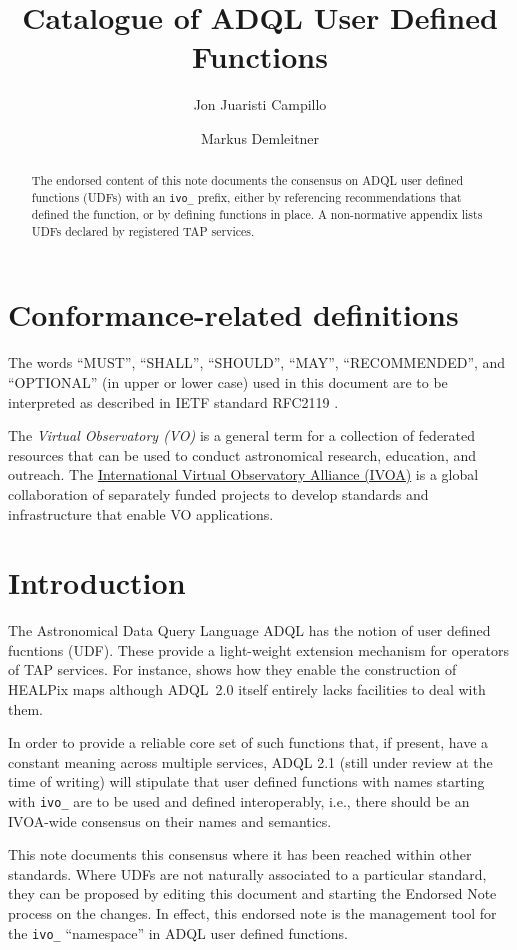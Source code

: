 \documentclass[11pt,a4paper]{ivoa}
\title{Catalogue of ADQL User Defined Functions}
\author{Jon Juaristi Campillo}
\author[https://wiki.ivoa.net/twiki/bin/view/IVOA/MarkusDemleitner]{Markus Demleitner}
\begin{document}
\begin{abstract}
The endorsed content of this note documents the consensus on ADQL user
defined functions (UDFs) with an \verb|ivo_| prefix, either by
referencing recommendations that defined the function, or by defining
functions in place.  A non-normative appendix lists UDFs declared by
registered TAP services.
\end{abstract}


\section*{Conformance-related definitions}

The words ``MUST'', ``SHALL'', ``SHOULD'', ``MAY'', ``RECOMMENDED'', and
``OPTIONAL'' (in upper or lower case) used in this document are to be
interpreted as described in IETF standard RFC2119 \citep{std:RFC2119}.

The \emph{Virtual Observatory (VO)} is a
general term for a collection of federated resources that can be used
to conduct astronomical research, education, and outreach.
The \href{http://www.ivoa.net}{International
Virtual Observatory Alliance (IVOA)} is a global
collaboration of separately funded projects to develop standards and
infrastructure that enable VO applications.


\section{Introduction}

The Astronomical Data Query Language ADQL \citep{2008ivoa.spec.1030O}
has the notion of user defined fucntions (UDF).  These provide a
light-weight extension mechanism for operators of TAP services.  
For instance, \citet{2016arXiv161109190T} shows how they enable the
construction of HEALPix maps although ADQL~2.0 itself entirely lacks
facilities to deal with them.

In order to provide a reliable core set of such functions that, if
present, have a constant meaning across multiple services, ADQL 2.1
(still under review at the time of writing) will stipulate that user
defined functions with names starting with \verb|ivo_| are to be used
and defined interoperably, i.e., there should be an IVOA-wide consensus
on their names and semantics. 

This note documents this consensus where it has been reached within
other standards.  Where UDFs are not naturally associated to a
particular standard, they can be proposed by editing this document and
starting the Endorsed Note process \citep{2017ivoa.spec.0517G} on the
changes.  In effect, this endorsed note is the management tool for
the \verb|ivo_| ``namespace'' in ADQL user defined functions.
\end{document}
